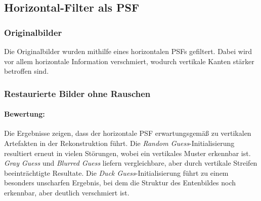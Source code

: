 \noindent
\begin{minipage}[t]{0.5\textwidth}
\end{minipage}
%
\begin{minipage}[t]{0.5\textwidth}
\end{minipage}




\newpage
\subsection{Horizontal-Filter als PSF}

\subsubsection{Originalbilder}

Die Originalbilder wurden mithilfe eines horizontalen PSFs gefiltert. Dabei wird vor allem horizontale Information verschmiert, wodurch vertikale Kanten stärker betroffen sind.

\noindent
\begin{minipage}[t]{0.5\textwidth}
\end{minipage}
%
\begin{minipage}[t]{0.5\textwidth}
\end{minipage}

\subsubsection{Restaurierte Bilder ohne Rauschen}

\paragraph{Bewertung:}
Die Ergebnisse zeigen, dass der horizontale PSF erwartungsgemäß zu vertikalen Artefakten in der Rekonstruktion führt. Die \textit{Random Guess}-Initialisierung resultiert erneut in vielen Störungen, wobei ein vertikales Muster erkennbar ist. \textit{Gray Guess} und \textit{Blurred Guess} liefern vergleichbare, aber durch vertikale Streifen beeinträchtigte Resultate. Die \textit{Duck Guess}-Initialisierung führt zu einem besonders unscharfen Ergebnis, bei dem die Struktur des Entenbildes noch erkennbar, aber deutlich verschmiert ist.

